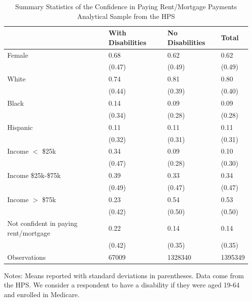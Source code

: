 \documentclass[12pt]{article}
\begin{document}
\begin{table}[!ht]
    \centering
    \caption{Summary Statistics of the Confidence in Paying Rent/Mortgage Payments Analytical Sample from the HPS}
    \begin{tabular}{llll}
    \hline \hline
        ~ & With Disabilities & No Disabilities & Total \\ \hline
        Female & 0.68  & 0.62  & 0.62  \\ 
        ~ & (0.47) & (0.49) & (0.49) \\ 
        White & 0.74  & 0.81  & 0.80  \\ 
        ~ & (0.44) & (0.39) & (0.40) \\ 
        Black & 0.14  & 0.09  & 0.09  \\ 
        ~ & (0.34) & (0.28) & (0.28) \\ 
        Hispanic & 0.11  & 0.11  & 0.11  \\ 
        ~ & (0.32) & (0.31) & (0.31) \\ 
        Income $<$ \$25k & 0.34  & 0.09  & 0.10  \\ 
        ~ & (0.47) & (0.28) & (0.30) \\ 
        Income \$25k-\$75k & 0.39  & 0.33  & 0.34  \\ 
        ~ & (0.49) & (0.47) & (0.47) \\ 
        Income $>$ \$75k & 0.23  & 0.54  & 0.53  \\ 
        ~ & (0.42) & (0.50) & (0.50) \\ 
        Not confident in paying rent/mortgage & 0.22  & 0.14  & 0.14  \\ 
        ~ & (0.42) & (0.35) & (0.35) \\ 
        Observations & 67009 & 1328340 & 1395349 \\ 
        \hline \hline
    \end{tabular}
    \label{hps_diff_expns_sample}
        \medskip 
\begin{minipage}{0.9\textwidth} 
{\footnotesize Notes: Means reported with standard deviations in parentheses. Data come from the HPS. We consider a respondent to have a disability if they were aged 19-64 and enrolled in Medicare. \par}
\end{minipage}
\end{table}

\clearpage
 

 
\end{document}
